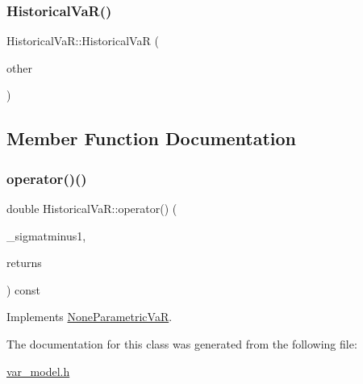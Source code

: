 \hypertarget{classHistoricalVaR_a75f77512a689c5f4826421e354f3053d}{}\label{classHistoricalVaR_a75f77512a689c5f4826421e354f3053d} 
\subsubsection{\texorpdfstring{Historical\+Va\+R()}{HistoricalVaR()}\hspace{0.1cm}{\footnotesize\ttfamily [2/2]}}
{\footnotesize\ttfamily Historical\+Va\+R\+::\+Historical\+VaR (\begin{DoxyParamCaption}\item[{const \hyperlink{classHistoricalVaR}{Historical\+VaR} \&}]{other }\end{DoxyParamCaption})}



\subsection{Member Function Documentation}
\hypertarget{classHistoricalVaR_a472b04dc9a4c5989be0e7198bc9c4189}{}\label{classHistoricalVaR_a472b04dc9a4c5989be0e7198bc9c4189} 
\subsubsection{\texorpdfstring{operator()()}{operator()()}}
{\footnotesize\ttfamily double Historical\+Va\+R\+::operator() (\begin{DoxyParamCaption}\item[{double}]{\+\_\+sigmatminus1,  }\item[{const \hyperlink{compute__returns__eigen_8h_a1eb6a9306ef406d7975f3cbf2e247777}{Vec} \&}]{returns }\end{DoxyParamCaption}) const\hspace{0.3cm}{\ttfamily [virtual]}}



Implements \hyperlink{classNoneParametricVaR_a958aae1b9bc03a8ef87295df30db76f7}{None\+Parametric\+VaR}.



The documentation for this class was generated from the following file\+:\begin{DoxyCompactItemize}
\item 
\hyperlink{var__model_8h}{var\+\_\+model.\+h}\end{DoxyCompactItemize}
